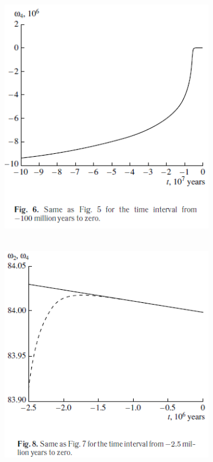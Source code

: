 \documentclass[fontsize = 11pt,a4paper]{article}
\begin{document}
\begin{figure}[h!]
\begin{subfigure}[t]{0.4\linewidth}
  \end{subfigure}
  \begin{subfigure}[b]{0.4\linewidth}
    \includegraphics[width=\linewidth]{graph6.png}
  \end{subfigure}
 \begin{subfigure}[b]{0.4\linewidth}
\hbox{\hspace{+9em}
    \includegraphics[width=\linewidth]{graph8.png}
}
  \end{subfigure}
\end{figure}
\end{document}
